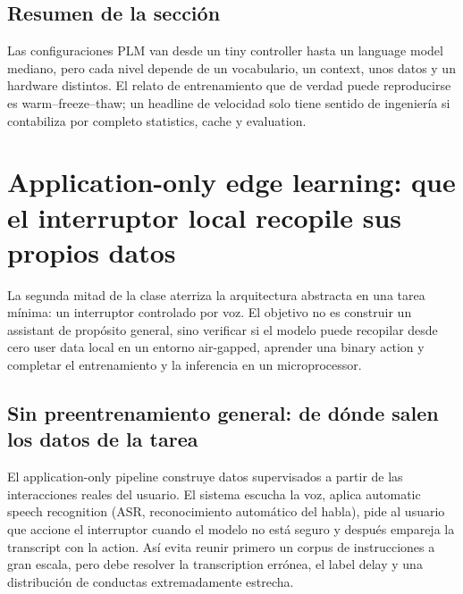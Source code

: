 \documentclass[a4paper]{article}
\begin{document}


\subsection{Resumen de la sección}

Las configuraciones PLM van desde un tiny controller hasta un language model mediano, pero cada nivel depende de un vocabulario, un context, unos datos y un hardware distintos. El relato de entrenamiento que de verdad puede reproducirse es warm--freeze--thaw; un headline de velocidad solo tiene sentido de ingeniería si contabiliza por completo statistics, cache y evaluation.
\section{Application-only edge learning: que el interruptor local recopile sus propios datos}

La segunda mitad de la clase aterriza la arquitectura abstracta en una tarea mínima: un interruptor controlado por voz. El objetivo no es construir un assistant de propósito general, sino verificar si el modelo puede recopilar desde cero user data local en un entorno air-gapped, aprender una binary action y completar el entrenamiento y la inferencia en un microprocessor.

\subsection{Sin preentrenamiento general: de dónde salen los datos de la tarea}

El application-only pipeline construye datos supervisados a partir de las interacciones reales del usuario. El sistema escucha la voz, aplica automatic speech recognition (ASR, reconocimiento automático del habla), pide al usuario que accione el interruptor cuando el modelo no está seguro y después empareja la transcript con la action. Así evita reunir primero un corpus de instrucciones a gran escala, pero debe resolver la transcription errónea, el label delay y una distribución de conductas extremadamente estrecha.
\end{document}

